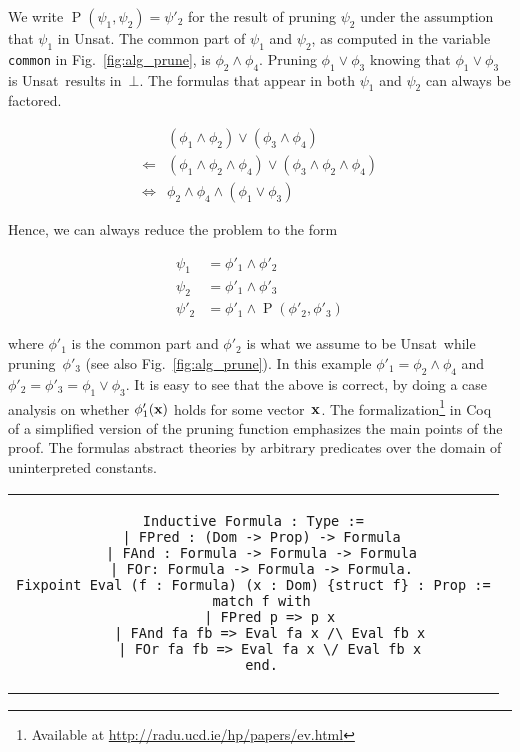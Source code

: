 \documentclass{llncs}
\def\lstinlinen{\lstinline[basicstyle=\normalsize\sffamily]}
\DeclareMathOperator{\Prune}{P}
\def\unsat{{\sc Unsat}}
\def\false{\bot}
\def\equ{\Leftrightarrow}
\def\pmi{\Leftarrow}
\def\vec#1{{\bf #1}}
\begin{document}
\noindent
We write $\Prune(\psi_1,\psi_2)=\psi'_2$ for the result of
pruning $\psi_2$ under the assumption that $\psi_1$ in \unsat.
The common part of $\psi_1$ and $\psi_2$, as computed in the
variable \lstinlinen|common| in Fig.~\ref{fig:alg_prune},
is $\phi_2\land\phi_4$. Pruning $\phi_1\lor\phi_3$ knowing 
that $\phi_1\lor\phi_3$ is \unsat\ results in~$\false$. 
The formulas that appear in both $\psi_1$ and $\psi_2$ 
can always be factored.

\begin{align}
     & (\phi_1\land\phi_2)\lor(\phi_3\land\phi_4) \\
\pmi & (\phi_1\land\phi_2\land\phi_4)\lor(\phi_3\land\phi_2\land\phi_4) \\
\equ & \phi_2\land\phi_4\land(\phi_1\lor\phi_3)
\end{align}

\noindent
Hence, we can always reduce the problem to the form

\begin{align} 
\psi_1 &= \phi'_1\land\phi'_2 \\
\psi_2 &= \phi'_1\land\phi'_3 \\
\psi'_2 &= \phi'_1\land\Prune(\phi'_2,\phi'_3)
\end{align}

\noindent
where $\phi'_1$ is the common part and $\phi'_2$ is what we
assume to be \unsat\ while pruning~$\phi'_3$ (see also Fig.~\ref{fig:alg_prune}). 
In this example $\phi'_1=\phi_2\land\phi_4$ and 
$\phi'_2=\phi'_3=\phi_1\lor\phi_3$.
It is easy to see that the above is correct, by doing a case
analysis on whether $\phi'_1(\vec x)$ holds for some vector~$\vec x$. 
The formalization\footnote{Available at
\url{http://radu.ucd.ie/hp/papers/ev.html}} in Coq~\cite{coq}
of a simplified version of the pruning function emphasizes
the main points of the proof. The formulas abstract theories
by arbitrary predicates over the domain of uninterpreted
constants.

\begin{tabular}{c}
\begin{lstlisting}
Inductive Formula : Type :=
  | FPred : (Dom -> Prop) -> Formula
  | FAnd : Formula -> Formula -> Formula
  | FOr: Formula -> Formula -> Formula.
Fixpoint Eval (f : Formula) (x : Dom) {struct f} : Prop :=
  match f with
    | FPred p => p x
    | FAnd fa fb => Eval fa x /\ Eval fb x
    | FOr fa fb => Eval fa x \/ Eval fb x
  end.
\end{lstlisting}
\end{tabular}
\end{document}
